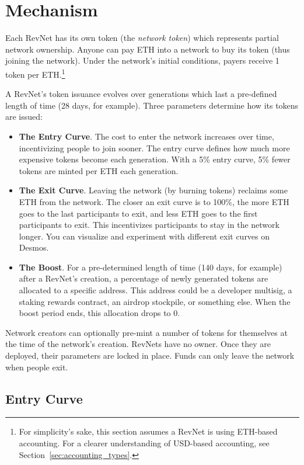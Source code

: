 \documentclass{article}
\begin{document}
\section{Mechanism}

Each RevNet has its own token (the \textit{network token}) which represents partial network ownership. Anyone can pay ETH into a network to buy its token (thus joining the network). Under the network's initial conditions, payers receive 1 token per ETH.\footnote{For simplicity's sake, this section assumes a RevNet is using ETH-based accounting. For a clearer understanding of USD-based accounting, see Section~\ref{sec:accounting_types}.}

A RevNet's token issuance evolves over generations which last a pre-defined length of time (28 days, for example). Three parameters determine how its tokens are issued:

\begin{itemize}
  \item \textbf{The Entry Curve}. The cost to enter the network increases over time, incentivizing people to join sooner. The entry curve defines how much more expensive tokens become each generation. With a 5\% entry curve, 5\% fewer tokens are minted per ETH each generation.
  \item \textbf{The Exit Curve}. Leaving the network (by burning tokens) reclaims some ETH from the network. The closer an exit curve is to 100\%, the more ETH goes to the last participants to exit, and less ETH goes to the first participants to exit. This incentivizes participants to stay in the network longer. You can visualize and experiment with different exit curves on Desmos.
  \item \textbf{The Boost}. For a pre-determined length of time (140 days, for example) after a RevNet's creation, a percentage of newly generated tokens are allocated to a specific address. This address could be a developer multisig, a staking rewards contract, an airdrop stockpile, or something else. When the boost period ends, this allocation drops to 0.
\end{itemize}

Network creators can optionally pre-mint a number of tokens for themselves at the time of the network's creation. RevNets have no owner. Once they are deployed, their parameters are locked in place. Funds can only leave the network when people exit.

\subsection{Entry Curve}
\end{document}
